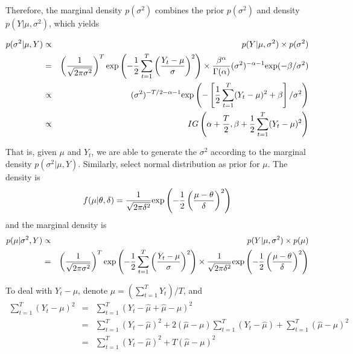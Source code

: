 \documentclass[11pt,reqno,final]{amsart}
\def\exp{\hbox{\rm exp}}
\begin{document}
Therefore, the marginal density $p(\sigma^2)$ combines the prior $p(\sigma^2)$ and density $p(Y|\mu, \sigma^2)$, which yields

\begin{eqnarray*}
p(\sigma^2|\mu, Y)  &\propto& p(Y|\mu,\sigma^2) \times p(\sigma^2) \\
                    &=& \left( \frac{1}{\sqrt{2\pi\sigma^2}} \right)^T \exp\left( -\frac{1}{2} \sum_{t=1}^{T} \left( \frac{Y_t - \mu}{\sigma}\right)^2 \right) \times \frac{\beta^{\alpha}}{\Gamma(\alpha)} (\sigma^2)^{-\alpha-1} \exp(-\beta/\sigma^2) \\
                    &\propto& (\sigma^2)^{-T/2-\alpha-1} \exp\left( -\left[\frac{1}{2}\sum_{t=1}^{T} (Y_t-\mu)^2 + \beta \right]/\sigma^2 \right) \\
                    &\propto& IG\left(\alpha+\frac{T}{2}, \beta+\frac{1}{2}\sum_{t=1}^{T}(Y_t-\mu)^2 \right)
\end{eqnarray*}

That is, given $\mu$ and $Y_t$, we are able to generate the $\sigma^2$ according to the marginal density $p(\sigma^2|\mu, Y)$. Similarly, select normal distribution as prior for $\mu$. The density is
$$
f(\mu|\theta,\delta) = \frac{1}{\sqrt{2\pi\delta^2}} \exp\left( -\frac{1}{2} \left( \frac{\mu-\theta}{\delta} \right)^2 \right)
$$
and the marginal density is
\begin{eqnarray*}
p(\mu|\sigma^2, Y)  &\propto& p(Y|\mu,\sigma^2) \times p(\mu) \\
                    &=& \left( \frac{1}{\sqrt{2\pi\sigma^2}} \right)^T \exp\left( -\frac{1}{2} \sum_{t=1}^{T} \left( \frac{Y_t - \mu}{\sigma}\right)^2 \right) \times \frac{1}{\sqrt{2\pi\delta^2}} \exp\left( -\frac{1}{2} \left( \frac{\mu-\theta}{\delta} \right)^2 \right)
\end{eqnarray*}

To deal with $Y_t - \mu$, denote $\hat{\mu}=\left( \sum_{t=1}^T Y_t \right)/T$, and
\begin{eqnarray*}
\sum_{t=1}^T (Y_t - \mu)^2 &=&  \sum_{t=1}^T (Y_t - \hat{\mu} + \hat{\mu} - \mu)^2 \\
                           &=&  \sum_{t=1}^T (Y_t - \hat{\mu})^2 + 2(\hat{\mu}-\mu)\sum_{t=1}^T(Y_t-\hat{\mu}) + \sum_{t=1}^T(\hat{\mu} - \mu)^2 \\
                           &=&  \sum_{t=1}^T (Y_t - \hat{\mu})^2 + T(\hat{\mu}-\mu)^2
\end{eqnarray*}
\end{document}
